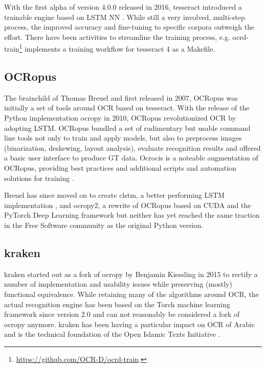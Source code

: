 \documentclass[sigconf]{acmart}
\begin{document}
With the first alpha of version 4.0.0 released in 2016, tesseract introduced a trainable
engine based on LSTM NN \cite{smith2016tesseract}. While still a very involved, multi-step process, the
improved accuracy and fine-tuning to specific corpora outweigh the effort.
There have been activities to streamline the training process, e.g.
ocrd-train\footnote{\url{https://github.com/OCR-D/ocrd-train}.} implements a training workflow for
tesseract 4 as a Makefile.

\subsection{OCRopus}

The brainchild of Thomas Breuel and first released in 2007, OCRopus
\cite{breuel} was initially a set of tools around OCR based on
tesseract. With the release of the Python implementation ocropy in
2010, OCRopus revolutionized OCR by adopting LSTM. OCRopus bundled a set of rudimentary but
usable command line tools not only to train and apply models, but
also to preprocess images (binarization, deskewing, layout analysis),
evaluate recognition results and offered a basic user interface to produce
GT data. Ocrocis is a noteable augmentation of OCRopus, providing best practices and
additional scripts and automation solutions for training \cite{springmann2015ocrocis}.

Breuel has since moved on to create clstm, a better
performing LSTM implementation \cite{DBLP:conf/icdar/Breuel17}, and
ocropy2, a rewrite of OCRopus based on CUDA and the PyTorch Deep
Learning framework \cite{DBLP:conf/icdar/Breuel17} but neither has
yet reached the same traction in the Free Software community as the
original Python version.


\subsection{kraken}

kraken \cite{DBLP:journals/corr/RomanovMSK17} started out as a fork of ocropy
by Benjamin Kiessling in 2015 to rectify a number of implementation and usability
issues while preserving (mostly) functional equivalence. While retaining many of
the algorithms around OCR, the actual recognition engine has been based on the
Torch machine learning framework since version 2.0 and can not reasonably be
considered a fork of ocropy anymore. kraken has been having a particular impact
on OCR of Arabic and is the technical foundation of the Open Islamic Texts
Initiative \cite{miller_romanov_savant_2018}.
\end{document}
